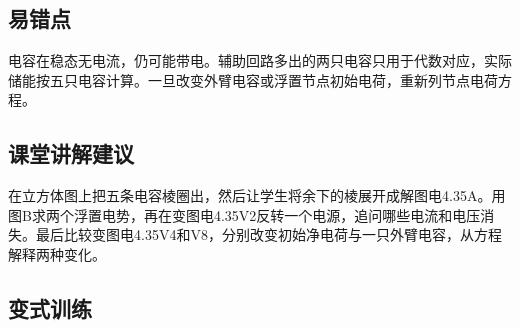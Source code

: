 \documentclass[UTF8,fontset=fandol,a4paper,11pt]{ctexart}
\begin{document}


\subsection*{易错点}

电容在稳态无电流，仍可能带电。辅助回路多出的两只电容只用于代数对应，实际储能按五只电容计算。一旦改变外臂电容或浮置节点初始电荷，重新列节点电荷方程。



\subsection*{课堂讲解建议}

在立方体图上把五条电容棱圈出，然后让学生将余下的棱展开成解图电4.35A。用图B求两个浮置电势，再在变图电4.35V2反转一个电源，追问哪些电流和电压消失。最后比较变图电4.35V4和V8，分别改变初始净电荷与一只外臂电容，从方程解释两种变化。


\subsection*{变式训练}
\end{document}

